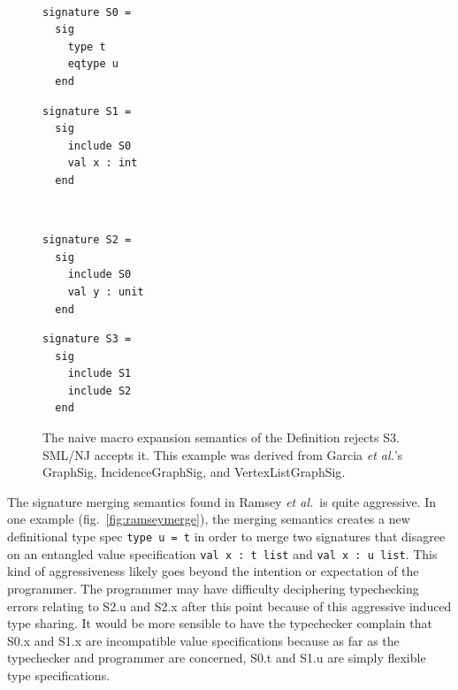 \documentclass[12pt]{article}
\newcommand{\etal}{{\it et al.}}
\begin{document}
\begin{figure}[ht]
\hrulefill\\
\begin{minipage}[b]{0.5\linewidth}
\begin{lstlisting}[frame=none]
signature S0 = 
  sig 
    type t
    eqtype u
  end
\end{lstlisting}
\end{minipage}
\hspace{0.1em}
\begin{minipage}[b]{0.5\linewidth}
\begin{lstlisting}[frame=none]
signature S1 = 
  sig 
    include S0
    val x : int
  end
\end{lstlisting}
\end{minipage}\\
\begin{minipage}[b]{0.5\linewidth}
\begin{lstlisting}[frame=none]
signature S2 = 
  sig 
    include S0 
    val y : unit 
  end
\end{lstlisting}
\end{minipage}
\hspace{0.1em}
\begin{minipage}[b]{0.5\linewidth}
\begin{lstlisting}[frame=none]
signature S3 = 
  sig 
    include S1 
    include S2 
  end
\end{lstlisting}
\end{minipage}
\hrulefill
\caption{The naive macro expansion semantics of the Definition rejects S3. SML/NJ accepts it. This example was derived from Garcia \etal's GraphSig, IncidenceGraphSig, and VertexListGraphSig\cite{garcia05:extendedcomparing05}.}
\label{fig:garciasigmerge}
\end{figure}

The signature merging semantics found in Ramsey \etal~is quite aggressive. In one example (fig.~\ref{fig:ramseymerge}), the merging semantics creates a new definitional type spec \lstinline{type u = t} in order to merge two signatures that disagree on an entangled value specification \lstinline{val x : t list} and \lstinline{val x : u list}. This kind of aggressiveness likely goes beyond the intention or expectation of the programmer. The programmer may have difficulty deciphering typechecking errors relating to S2.u and S2.x after this point because of this aggressive induced type sharing. It would be more sensible to have the typechecker complain that S0.x and S1.x are incompatible value specifications because as far as the typechecker and programmer are concerned, S0.t and S1.u are simply flexible type specifications. 
\end{document}
